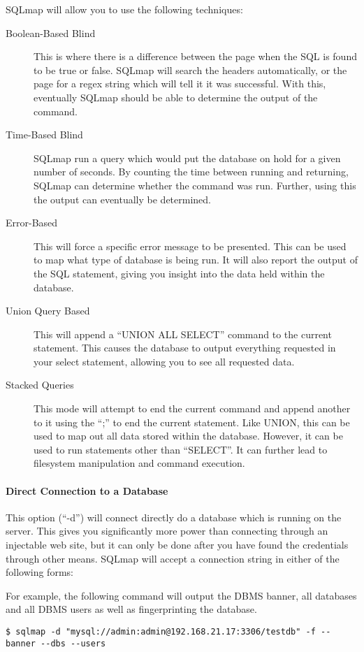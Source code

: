 			SQLmap will allow you to use the following techniques:
			\begin{description}
				\item[Boolean-Based Blind] This is where there is a difference between the page when the SQL is found to be true or false. 
					SQLmap will search the headers automatically, or the page for a regex string which will tell it it was successful. 
					With this, eventually SQLmap should be able to determine the output of the command. 
				\item[Time-Based Blind] SQLmap run a query which would put the database on hold for a given number of seconds. 
					By counting the time between running and returning, SQLmap can determine whether the command was run. 
					Further, using this the output can eventually be determined. 
				\item[Error-Based] This will force a specific error message to be presented. 
					This can be used to map what type of database is being run. 
					It will also report the output of the SQL statement, giving you insight into the data held within the database. 
				\item[Union Query Based] This will append a ``UNION ALL SELECT'' command to the current statement. 
					This causes the database to output everything requested in your select statement, allowing you to see all requested data. 
				\item[Stacked Queries] This mode will attempt to end the current command and append another to it using the ``;'' to end the current statement. 
					Like UNION, this can be used to map out all data stored within the database. 
					However, it can be used to run statements other than ``SELECT''. 
					It can further lead to filesystem manipulation and command execution. 
			\end{description}
			\paragraph{Direct Connection to a Database}
				This option (``-d'') will connect directly do a database which is running on the server. 
				This gives you significantly more power than connecting through an injectable web site, but it can only be done after you have found the credentials through other means. 
				SQLmap will accept a connection string in either of the following forms:
				
				For example, the following command will output the DBMS banner, all databases and all DBMS users as well as fingerprinting the database. 
				\begin{lstlisting}[style=CLI]
					$ sqlmap -d "mysql://admin:admin@192.168.21.17:3306/testdb" -f --banner --dbs --users
				\end{lstlisting}


